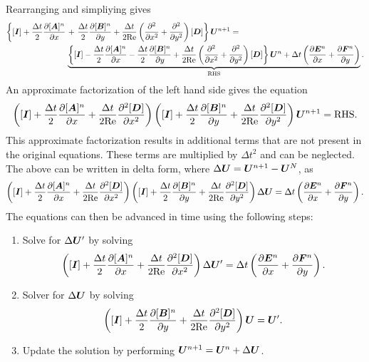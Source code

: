 \documentclass[reqno]{amsart}
\begin{document}
    Rearranging and simpliying gives
    \begin{equation*}
        \begin{aligned}
            \left\{[\bI] + \frac{\Delta t}{2}\pdiff[[\bA]^n]{x}\right. &+ \left.\frac{\Delta t}{2}\pdiff[[\bB]^n]{y} + \frac{\Delta t}{2\mathrm{Re}}\left(\pdifftwo{x} + \pdifftwo{y}\right)[\bD]\right\}\bU^{n+1} = \\
           &\underbrace{\left\{[\bI] - \frac{\Delta t}{2}\pdiff[[\bA]^n]{x} - \frac{\Delta t}{2}\pdiff[[\bB]^n]{y} + \frac{\Delta t}{2\mathrm{Re}}\left(\pdifftwo{x} + \pdifftwo{y}\right)[\bD]\right\}\bU^n + \Delta t\left(\pdiff[\bE^n]{x} + \pdiff[\bF^n]{y}\right)}_{\text{RHS}}.
        \end{aligned}
    \end{equation*}
    An approximate factorization of the left hand side gives the equation
    \begin{equation*}
        \left([\bI] + \frac{\Delta t}{2}\pdiff[[\bA]^n]{x} + \frac{\Delta t}{2\mathrm{Re}}\pdifftwo[[\bD]]{x}\right)
        \left([\bI] + \frac{\Delta t}{2}\pdiff[[\bB]^n]{y} + \frac{\Delta t}{2\mathrm{Re}}\pdifftwo[[\bD]]{y}\right)\bU^{n+1} = \text{RHS}.
    \end{equation*}
    This approximate factorization results in additional terms that are not present in the original equations.
    These terms are multiplied by $\Delta t^2$ and can be neglected.
    The above can be written in delta form, where $\Delta \bm{U} = \bm{U}^{n+1} - \bm{U}^N$, as
    \begin{equation*}
        \left([\bI] + \frac{\Delta t}{2}\pdiff[[\bA]^n]{x} + \frac{\Delta t}{2\mathrm{Re}}\pdifftwo[[\bD]]{x}\right)
        \left([\bI] + \frac{\Delta t}{2}\pdiff[[\bB]^n]{y} + \frac{\Delta t}{2\mathrm{Re}}\pdifftwo[[\bD]]{y}\right)\Delta \bU = \Delta t\left(\pdiff[\bE^n]{x} + \pdiff[\bF^n]{y}\right).
    \end{equation*}
    The equations can then be advanced in time using the following steps:
    \begin{enumerate}
        \item Solve for $\Delta \bm{U}'$ by solving
            \[\left([\bI] + \frac{\Delta t}{2}\pdiff[[\bA]^n]{x} + \frac{\Delta t}{2\mathrm{Re}}\pdifftwo[[\bD]]{x}\right)\Delta \bU' = \Delta t\left(\pdiff[\bE^n]{x} + \pdiff[\bF^n]{y}\right).\]
        \item Solver for $\Delta \bm{U}$ by solving
            \[\left([\bI] + \frac{\Delta t}{2}\pdiff[[\bB]^n]{y} + \frac{\Delta t}{2\mathrm{Re}}\pdifftwo[[\bD]]{y}\right)\bU = \bU'.\]
        \item Update the solution by performing $\bm{U}^{n+1} = \bm{U}^n + \Delta \bm{U}$.
    \end{enumerate}
\end{document}
